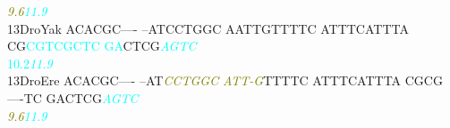 \documentclass[11pt,twoside,reqno,a4paper]{article}
\begin{document}
{\hspace*{4\charwidth}\hspace*{7\charwidth}\hspace*{1\charwidth}\hspace*{14\charwidth}\textit{\textcolor{olive}{9.6}}\hspace*{1\charwidth}\hspace*{1\charwidth}\hspace*{1\charwidth}\hspace*{1\charwidth}\hspace*{39\charwidth}\textit{\textcolor{cyan}{11.9}}\hspace*{1\charwidth}\\
13\hspace*{2\charwidth}DroYak	ACACGC----	--ATCCTGGC	AATTGTTTTC	ATTTCATTTA	CG\textcolor{cyan}{C}\textcolor{cyan}{G}\textcolor{cyan}{T}\textcolor{cyan}{C}\textcolor{cyan}{G}\textcolor{cyan}{C}\textcolor{cyan}{T}\textcolor{cyan}{C}	\textcolor{cyan}{G}\textcolor{cyan}{A}CTCG\textit{\textcolor{cyan}{A}}\textit{\textcolor{cyan}{G}}\textit{\textcolor{cyan}{T}}\textit{\textcolor{cyan}{C}}	\\
\hspace*{4\charwidth}\hspace*{7\charwidth}\hspace*{1\charwidth}\hspace*{1\charwidth}\hspace*{1\charwidth}\hspace*{1\charwidth}\hspace*{42\charwidth}\textcolor{cyan}{10.2}\hspace*{1\charwidth}\hspace*{10\charwidth}\textit{\textcolor{cyan}{11.9}}\hspace*{1\charwidth}\\
13\hspace*{2\charwidth}DroEre	ACACGC----	--AT\textit{\textcolor{olive}{C}}\textit{\textcolor{olive}{C}}\textit{\textcolor{olive}{T}}\textit{\textcolor{olive}{G}}\textit{\textcolor{olive}{G}}\textit{\textcolor{olive}{C}}	\textit{\textcolor{olive}{A}}\textit{\textcolor{olive}{T}}\textit{\textcolor{olive}{T}}\textit{\textcolor{olive}{-}}\textit{\textcolor{olive}{G}}TTTTC	ATTTCATTTA	CGCG----TC	GACTCG\textit{\textcolor{cyan}{A}}\textit{\textcolor{cyan}{G}}\textit{\textcolor{cyan}{T}}\textit{\textcolor{cyan}{C}}	\\
\hspace*{4\charwidth}\hspace*{7\charwidth}\hspace*{1\charwidth}\hspace*{14\charwidth}\textit{\textcolor{olive}{9.6}}\hspace*{1\charwidth}\hspace*{1\charwidth}\hspace*{1\charwidth}\hspace*{1\charwidth}\hspace*{39\charwidth}\textit{\textcolor{cyan}{11.9}}\hspace*{1\charwidth}\\
}
\end{document}
